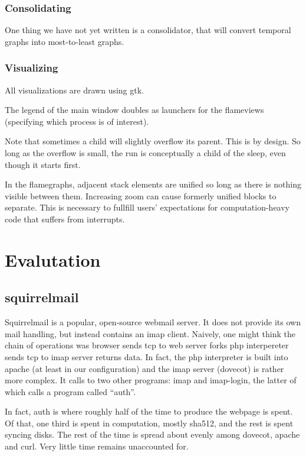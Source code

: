 \documentclass[10pt]{article}
\begin{document}
\subsubsection{Consolidating}

One thing we have not yet written is a consolidator, that will convert temporal graphs into most-to-least graphs.

\subsubsection{Visualizing}

All visualizations are drawn using gtk.

The legend of the main window doubles as launchers for the flameviews (specifying which process is of interest).

Note that sometimes a child will slightly overflow its parent.  This is by design.  So long as the overflow is small, the run is conceptually a child of the sleep, even though it starts first.

In the flamegraphs, adjacent stack elements are unified so long as there is nothing visible between them.  Increasing zoom can cause formerly unified blocks to separate.  This is necessary to fullfill users' expectations for computation-heavy code that suffers from interrupts.

\section{Evalutation}
\subsection{squirrelmail}

Squirrelmail is a popular, open-source webmail server.  It does not provide its own mail handling, but instead contains an imap client.  Naively, one might think the chain of operations was browser sends tcp to web server forks php interpereter sends tcp to imap server returns data.  In fact, the php interpreter is built into apache (at least in our configuration) and the imap server (dovecot) is rather more complex.  It calls to two other programs: imap and imap-login, the latter of which calls a program called ``auth''.

In fact, auth is where roughly half of the time to produce the webpage is spent.  Of that, one third is spent in computation, mostly sha512, and the rest is spent syncing disks.  The rest of the time is spread about evenly among dovecot, apache and curl.  Very little time remains unaccounted for.
\end{document}
